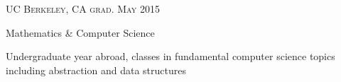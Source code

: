 {\raggedright
  \textsc{\small{UC Berkeley, CA
    \hfill
    {\raggedleft
      grad. May 2015
    }
  }}

  {\raggedright\large {
    Mathematics \& Computer Science
  } \\}

  \normalsize{
    Undergraduate year abroad, classes in fundamental computer science topics including abstraction and data structures
  }

  \vspace{8pt}
}
